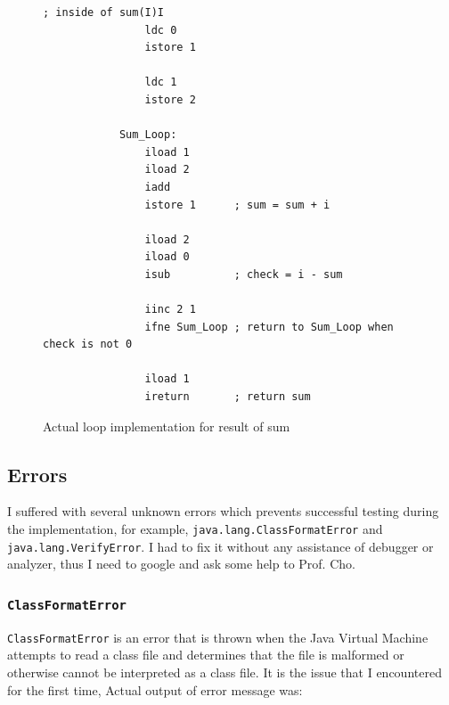 \documentclass[a4paper, 12pt]{article}
\begin{document}
        \begin{figure}[H]
            \begin{lstlisting}[gobble=8]
            ; inside of sum(I)I
                ldc 0
                istore 1
            
                ldc 1
                istore 2
            
            Sum_Loop:
                iload 1     
                iload 2
                iadd
                istore 1      ; sum = sum + i
                
                iload 2
                iload 0
                isub          ; check = i - sum
            
                iinc 2 1
                ifne Sum_Loop ; return to Sum_Loop when check is not 0
            
                iload 1
                ireturn       ; return sum
            \end{lstlisting}
    
            \centering        
            \caption{Actual loop implementation for result of sum}
        \end{figure}
        
        \subsection{Errors}
        I suffered with several unknown errors which prevents successful testing during the implementation, for example, \texttt{java.lang.ClassFormatError} and \texttt{java.lang.VerifyError}. I had to fix it without any assistance of debugger or analyzer, thus I need to google and ask some help to Prof. Cho. 
    
            \subsubsection{\texttt{ClassFormatError}}
            \texttt{ClassFormatError} is an error that is thrown when the Java Virtual Machine attempts to read a class file and determines that the file is malformed or otherwise cannot be interpreted as a class file. \cite{oracle_cfe} It is the issue that I encountered for the first time, Actual output of error message was:
            
\end{document}
